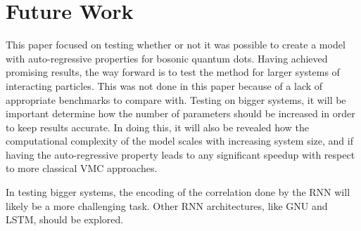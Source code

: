 \section{Future Work}
This paper focused on testing whether or not it was possible to create a model with auto-regressive properties for bosonic quantum dots. Having achieved promising results, the way forward is to test the method for larger systems of interacting particles. This was not done in this paper because of a lack of appropriate benchmarks to compare with. Testing on bigger systems, it will be important determine how the number of parameters should be increased in order to keep results accurate. In doing this, it will also be revealed how the computational complexity of the model scales with increasing system size, and if having the auto-regressive property leads to any significant speedup with respect to more classical VMC approaches.

In testing bigger systems, the encoding of the correlation done by the RNN will likely be a more challenging task. Other RNN architectures, like GNU and LSTM, should be explored.
